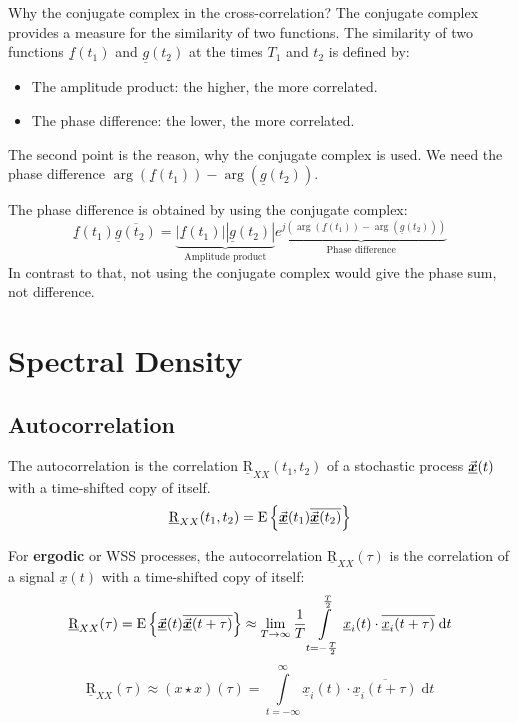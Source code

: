 \begin{refsection}
\begin{excursus}{Why the conjugate complex in the cross-correlation?}
	The conjugate complex provides a measure for the similarity of two functions. The similarity of two functions $\underline{f}(t_1)$ and $\underline{g}(t_2)$ at the times $T_1$ and $t_2$ is defined by:
	\begin{itemize}
		\item The amplitude product: the higher, the more correlated.
		\item The phase difference: the lower, the more correlated.
	\end{itemize}
	The second point is the reason, why the conjugate complex is used. We need the phase difference $\arg\left(\underline{f}(t_1)\right) - \arg\left(\underline{g}(t_2)\right)$.
	
	The phase difference is obtained by using the conjugate complex:
	\begin{equation}
		\underline{f}(t_1) \overline{\underline{g}(t_2)} = \underbrace{\left|\underline{f}(t_1)\right|\left|\underline{g}(t_2)\right|}_{\text{Amplitude product}} \underbrace{e^{j\left(\arg\left(\underline{f}(t_1)\right) - \arg\left(\underline{g}(t_2)\right)\right)}}_{\text{Phase difference}}
	\end{equation}
	In contrast to that, not using the conjugate complex would give the phase sum, not difference.
\end{excursus}

\section{Spectral Density}

\subsection{Autocorrelation}

The autocorrelation is the correlation $\underline{\mathrm{R}}_{XX}(t_1, t_2)$ of a stochastic process $\vec{\bm{\underline{x}}}(t)$ with a time-shifted copy of itself.
\begin{equation}
	\underline{\mathrm{R}}_{XX}(t_1, t_2) = \mathrm{E}\left\{ \vec{\bm{\underline{x}}}(t_1) \overline{\vec{\bm{\underline{x}}}(t_2)} \right\}
\end{equation}

For \textbf{ergodic} or \ac{WSS} processes, the autocorrelation $\underline{\mathrm{R}}_{XX}(\tau)$ is the correlation of a signal $\underline{x}(t)$ with a time-shifted copy of itself:
\begin{equation}
	\underline{\mathrm{R}}_{XX}(\tau) = \mathrm{E}\left\{ \vec{\bm{\underline{x}}}(t) \overline{\vec{\bm{\underline{x}}}(t+\tau)} \right\} \approx \lim\limits_{T \rightarrow \infty} \frac{1}{T} \int\limits_{t = -\frac{T}{2}}^{\frac{T}{2}} \underline{x}_i(t) \cdot \overline{\underline{x}_i(t+\tau)} \; \mathrm{d} t
\end{equation}
\begin{equation}
	\underline{\mathrm{R}}_{XX}(\tau) \approx \left(x \star x\right)(\tau) = \int\limits_{t = -\infty}^{\infty} \underline{x}_i(t) \cdot \overline{\underline{x}_i(t+\tau)} \; \mathrm{d} t
\end{equation}


\end{refsection}
